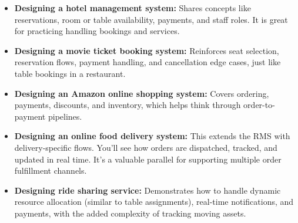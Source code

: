 \begin{itemize}
\item
\textbf{Designing a hotel management system:} Shares concepts like reservations, room or table availability, payments, and staff roles. It is great for practicing handling bookings and services.
\item
\textbf{Designing a movie ticket booking system:} Reinforces seat selection, reservation flows, payment handling, and cancellation edge cases, just like table bookings in a restaurant.
\item
\textbf{Designing an Amazon online shopping system:} Covers ordering, payments, discounts, and inventory, which helps think through order-to-payment pipelines.
\item
\textbf{Designing an online food delivery system:} This extends the RMS with delivery-specific flows. You'll see how orders are dispatched, tracked, and updated in real time. It's a valuable parallel for supporting multiple order fulfillment channels.
\item
\protect{}\label{6MFetYp4m_V6vtCMYYSMi}
\textbf{Designing ride sharing service:} Demonstrates how to handle dynamic resource allocation (similar to table assignments), real-time notifications, and payments, with the added complexity of tracking moving assets.
\end{itemize}

